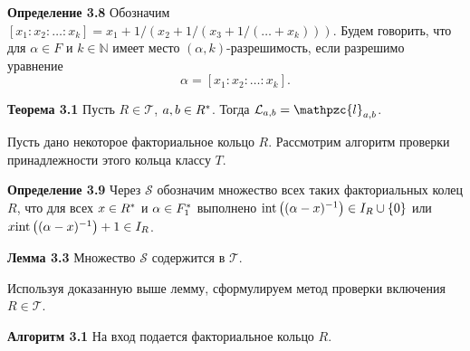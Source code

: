 \documentclass[_00_autoref.tex]{subfiles}
\begin{document}
\textbf{Определение 3.8}
    Обозначим $[x_1: x_2: \dots: x_k] = x_{1} + 1/(x_{2} + 1/(x_{3} + 1/(\dots + x_k)))$.
    Будем говорить, что для $\alpha \in F$ и $k \in \mathbb{N}$ имеет место $(\alpha, k)$-разрешимость, если разрешимо уравнение
    \begin{equation*}
        \alpha = [x_1: x_2: \dots: x_k].
    \end{equation*}

\textbf{Теорема 3.1}\label{theorem:Kroneker_Vahlen_theorem_in_UFD}
    Пусть $R \in \mathcal{T}$, $a, b \in R^{*}$.
    Тогда $\mathcal{L}_{a, b} = \mathpzc{l}_{a, b}$.


Пусть дано некоторое факториальное кольцо $R$.
Рассмотрим алгоритм проверки принадлежности этого кольца классу $T$.

\textbf{Определение 3.9}
    Через $\mathcal{S}$ обозначим множество всех таких факториальных колец $R$, что для всех $x \in R^{*}$ и $\alpha \in F_1^{*}$ выполнено $\textrm{int}\left((\alpha - x)^{-1}\right) \in I_{R} \cup \{0\}$ или $x \textrm{int}\left((\alpha - x)^{-1}\right) + 1 \in I_{R}$.

\textbf{Лемма 3.3}
    Множество $\mathcal{S}$ содержится в $\mathcal{T}$.

Используя доказанную выше лемму, сформулируем метод проверки включения $R \in \mathcal{T}$.

\textbf{Алгоритм 3.1}\label{algorithm:R_in_S}
    На вход подается факториальное кольцо $R$.
    
\end{document}
